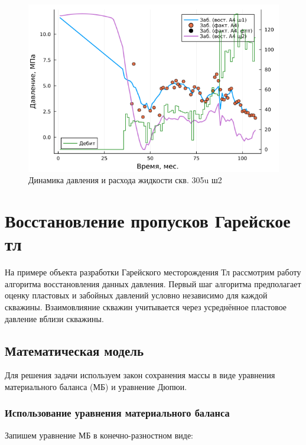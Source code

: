 \documentclass[14pt]{article}
\begin{document}
\begin{figure}[!htb]
	\centering
	\includegraphics[width=1.0\linewidth]{pic/pw_305u(3)_a4_stp2}
	\caption{Динамика давления и расхода жидкости скв. 305u ш2}
	\label{fig:pw305u3a4stp2}
\end{figure}


\section{Восстановление пропусков Гарейское тл}
На примере объекта разработки Гарейского месторождения Тл рассмотрим  работу алгоритма восстановления данных давления. Первый шаг алгоритма предполагает оценку пластовых и забойных давлений условно независимо для каждой скважины. Взаимовлияние скважин учитывается через усреднённое пластовое давление вблизи скважины.

\subsection{Математическая модель}
    Для решения задачи используем закон сохранения массы в виде уравнения материального баланса (МБ) и уравнение Дюпюи. 
    
\subsubsection{Использование уравнения материального баланса} Запишем уравнение МБ в конечно-разностном виде:
    
\end{document}

